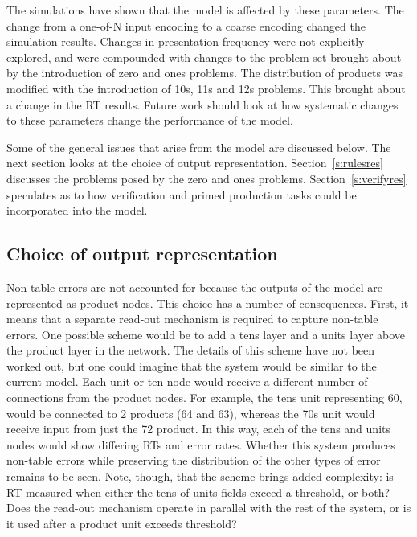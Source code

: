 The simulations have shown that the model is affected by these parameters.
The change from a one-of-N input encoding to a coarse encoding changed the
simulation results.  Changes in presentation frequency were not explicitly
explored,
and were compounded with changes to the problem set brought about by the
introduction of zero and ones problems.  The distribution of products was
modified with the introduction of 10s, 11s and 12s problems.  This brought
about a change in the RT results.  Future work should look at how
systematic changes to these parameters change the performance of the model.

Some of the general issues that arise from the model are discussed below.
The next section looks at the choice of output representation.
Section~\ref{s:rulesres} discusses the problems posed by the zero and ones
problems. Section~\ref{s:verifyres} speculates as to how verification and
primed production tasks could be incorporated into the model.


\subsection{Choice of output representation}

Non-table errors are not accounted for because the outputs of the model are
represented as product nodes.  This choice has a number of consequences.
First, it means that a separate read-out mechanism is required to capture
non-table errors.  One possible scheme would be to add a tens layer and a
units layer above the product layer in the network.  The details of this
scheme have not been worked out, but one could imagine that the system
would be similar to the current model.  Each unit or ten node would receive
a different number of connections from the product nodes. For example, the
tens unit representing 60, would be connected to 2 products (64 and
63), whereas the 70s unit would receive input from just the 72 product. In
this way, each of the tens and units nodes would show differing RTs and
error rates. Whether this system produces non-table errors while preserving the
distribution of the other types of error remains to be seen.  Note, though,
that the scheme brings added complexity: is RT measured when either the
tens of units fields exceed a threshold, or both?  Does the read-out
mechanism operate in parallel with the rest of the system, or is it
used after a product unit exceeds threshold?

